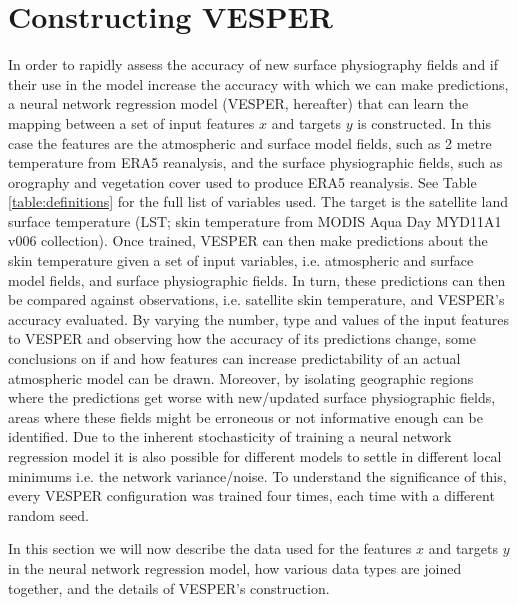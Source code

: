 \documentclass[hess, twostagejnl]{copernicus}
\begin{document}
\section{Constructing VESPER}\label{sec:2}
In order to rapidly assess the accuracy of new surface physiography fields and if their use in the model increase the accuracy with which we can make predictions, a neural network regression model (VESPER, hereafter) that can learn the mapping between a set of input features $x$ and targets $y$ is constructed. In this case the features are the atmospheric and surface model fields, such as 2 metre temperature from ERA5 reanalysis, and the surface physiographic fields, such as orography and vegetation cover used to produce ERA5 reanalysis. See Table \ref{table:definitions} for the full list of variables used. The target is the satellite land surface temperature (LST; skin temperature from MODIS Aqua Day MYD11A1 v006 collection). Once trained, VESPER can then make predictions about the skin temperature given a set of input variables, i.e. atmospheric and surface model fields, and surface physiographic fields. In turn, these predictions can then be compared against observations, i.e. satellite skin temperature, and VESPER's accuracy evaluated. By varying the number, type and values of the input features to VESPER and observing how the accuracy of its predictions change, some conclusions on if and how features can increase predictability of an actual atmospheric model can be drawn. Moreover, by isolating geographic regions where the predictions get worse with new/updated surface physiographic fields, areas where these fields might be erroneous or not informative enough can be identified. Due to the inherent stochasticity of training a neural network regression model it is also possible for different models to settle in different local minimums i.e. the network variance/noise. To understand the significance of this, every VESPER configuration was trained four times, each time with a different random seed. \newline 
	

\noindent In this section we will now describe the data used for the features $x$ and targets $y$ in the neural network regression model, how various data types are joined together, and the details of VESPER’s construction.
\end{document}
